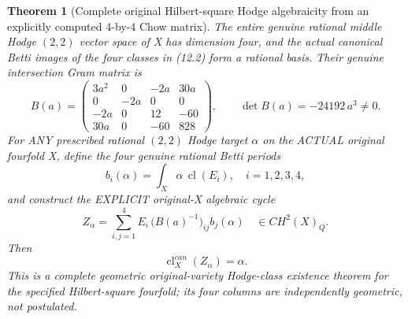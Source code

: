 \documentclass[11pt]{article}
\newcommand{\cl}{\operatorname{cl}}
\newtheorem{theorem}{Theorem}[section]
\begin{document}
\begin{theorem}[Complete original Hilbert-square Hodge algebraicity from an explicitly computed 4-by-4 Chow matrix]
The entire genuine rational
middle Hodge \((2,2)\) vector
space of X has dimension four,
and the actual canonical Betti
images of the four classes
in (12.2) form a rational basis.
Their genuine intersection Gram
matrix is
\[
 \boxed{
 B(a)=
 \begin{pmatrix}
  3a^2&0&-2a&30a\\
  0&-2a&0&0\\
  -2a&0&12&-60\\
  30a&0&-60&828
 \end{pmatrix},\qquad
 \det B(a)=-24192\,a^3\ne0 .}                     \tag{12.3}
\]
For ANY prescribed rational
\((2,2)\) Hodge target
\(\alpha\) on the ACTUAL
original fourfold X, define
the four genuine rational
Betti periods
\[
 b_i(\alpha)=\int_X\alpha\,\cl(E_i),
       \quad i=1,2,3,4,
\]
and construct the EXPLICIT
original-X algebraic cycle
\[
 \boxed{
 Z_\alpha=\sum_{i,j=1}^{4}
 E_i\,\bigl(B(a)^{-1}\bigr)_{ij}
                     b_j(\alpha)
        \quad\in CH^2(X)_Q.}                       \tag{12.4}
\]
Then
\[
 \boxed{\cl_X^{can}(Z_\alpha)=\alpha.}             \tag{12.5}
\]
This is a complete geometric
original-variety Hodge-class
existence theorem for the
specified Hilbert-square
fourfold; its four
columns are independently
geometric, not postulated.
\end{theorem}
\end{document}
